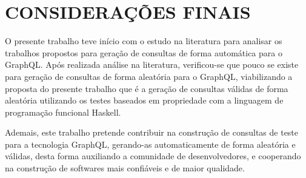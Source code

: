 \chapter{CONSIDERAÇÕES FINAIS}
\label{chap:consideracoes}
O presente trabalho teve início com o estudo na literatura para analisar os trabalhos propostos para geração de consultas de forma automática para o GraphQL. Após realizada análise na literatura, verificou-se que pouco se existe para geração de consultas de forma aleatória para o GraphQL, viabilizando a proposta do presente trabalho que é a geração de consultas válidas de forma aleatória utilizando os testes baseados em propriedade com a linguagem de programação funcional Haskell.

Ademais, este trabalho pretende contribuir na construção de consultas de teste para a tecnologia GraphQL, gerando-as automaticamente de forma aleatória e válidas, desta forma auxiliando a comunidade de desenvolvedores, e cooperando na construção de softwares mais confiáveis e de maior qualidade.
